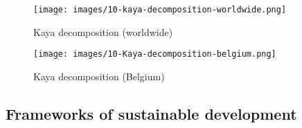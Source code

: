 \documentclass[../summary.tex]{subfiles}
\begin{document}
\begin{figure}[htbp]
	\centering
	\texttt{[image: images/10-kaya-decomposition-worldwide.png]}
	\caption{Kaya decomposition (worldwide)}
	\label{fig:Kaya-decomposition-world}
\end{figure}

\begin{figure}[htbp]
	\centering
	\texttt{[image: images/10-Kaya-decomposition-belgium.png]}
	\caption{Kaya decomposition (Belgium)}
	\label{fig:kaya-decomposition-belgium}
\end{figure}
\newpage
\subsection{Frameworks of sustainable development}
\end{document}
